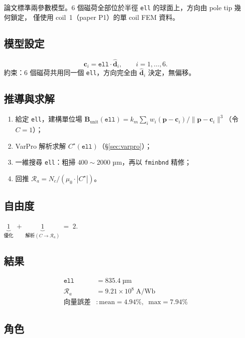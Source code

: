 \documentclass[11pt,a4paper]{article}
\newcommand{\mzero}{\mu_0}
\newcommand{\km}{k_m}
\newcommand{\Ra}{\mathcal{R}_a}
\newcommand{\Nc}{N_c}
\newcommand{\bvec}{\mathbf{B}}
\newcommand{\pvec}{\mathbf{p}}
\newcommand{\cvec}{\mathbf{c}}
\newcommand{\dhat}{\hat{\mathbf{d}}}
\begin{document}
論文標準兩參數模型。6 個磁荷全部位於半徑 \texttt{ell} 的球面上，方向由 pole tip 幾何鎖定，
僅使用 coil~1（paper P1）的單 coil FEM 資料。

\subsection{模型設定}

\begin{equation}
\cvec_i = \texttt{ell} \cdot \dhat_i, \qquad i = 1, \dots, 6.
\end{equation}
約束：6 個磁荷共用同一個 \texttt{ell}，方向完全由 \(\dhat_i\) 決定，無偏移。

\subsection{推導與求解}

\begin{enumerate}[leftmargin=*]
\item 給定 \texttt{ell}，建構單位場 \(\bvec_{\text{unit}}(\texttt{ell}) =
\km \sum_i w_i (\pvec - \cvec_i)/\|\pvec - \cvec_i\|^3\)（令 \(C = 1\)）；
\item VarPro 解析求解 \(C^\star(\texttt{ell})\)（\S\ref{sec:varpro}）；
\item 一維搜尋 \texttt{ell}：粗掃 \(400 \sim 2000\) µm，再以 \texttt{fminbnd} 精修；
\item 回推 \(\Ra = \Nc / (\mzero \cdot |C^\star|)\)。
\end{enumerate}

\subsection{自由度}
\(\underbrace{1}_{\text{優化}} \;+\; \underbrace{1}_{\text{解析} (C \to \Ra)} \;=\; 2.\)

\subsection{結果}
\begin{align*}
\texttt{ell} &= 835.4 \;\text{µm} \\
\Ra          &= 9.21 \times 10^{8} \;\text{A/Wb} \\
\text{向量誤差} &: \text{mean} = 4.94\%, \;\; \text{max} = 7.94\%
\end{align*}

\subsection{角色}
\end{document}

